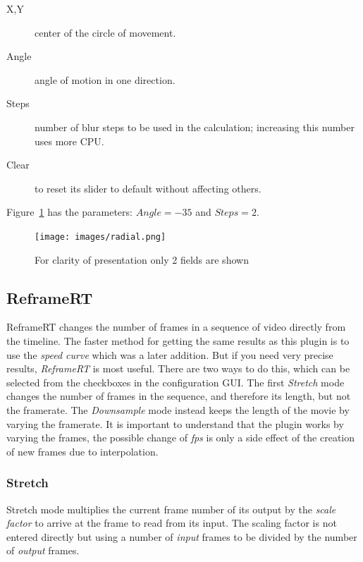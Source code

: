 \begin{description}
    \item[X,Y] center of the circle of movement.
    \item[Angle] angle of motion in one direction.
    \item[Steps] number of blur steps to be used in the calculation; increasing this number uses more CPU.
    \item[Clear] to reset its slider to default without affecting others.
\end{description}

Figure~\ref{fig:radial} has the parameters: $Angle=-35$ and $Steps=2$.

\begin{figure}[hbtp]
    \centering
    \texttt{[image: images/radial.png]}
    \caption{For clarity of presentation only 2 fields are shown}
    \label{fig:radial}
\end{figure}

\subsection{ReframeRT}%
\label{sub:reframert}

ReframeRT changes the number of frames in a sequence of video directly from the timeline. The faster method for getting the same results as this plugin is to use the \textit{speed curve} which was a later addition. But if you need very precise results, \textit{ReframeRT} is most useful. There are two ways to do this, which can be selected from the checkboxes in the configuration GUI. The first \textit{Stretch} mode changes the number of frames in the sequence, and therefore its length, but not the framerate. The \textit{Downsample} mode instead keeps the length of the movie by varying the framerate.
It is important to understand that the plugin works by varying the frames, the possible change of \textit{fps} is only a side effect of the creation of new frames due to interpolation.

\subsubsection*{Stretch}%
\label{ssub:stretch}

Stretch mode multiplies the current frame number of its output by the \textit{scale factor} to arrive at the frame to read from its input. The scaling factor is not entered directly but using a number of \textit{input} frames to be divided by the number of \textit{output} frames.

